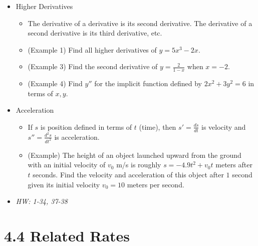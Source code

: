 \documentclass[11pt]{article}
\begin{document}
\begin{itemize}
\item Higher Derivatives
  \begin{itemize}
    \item The derivative of a derivative is its second derivative. The
          derivative of a second derivative is its third derivative, etc.
    \item (Example 1) Find all higher derivatives of \(y=5x^3-2x\).
    \item (Example 3) Find the second derivative of \(y=\frac{2}{1-x}\) when
          \(x=-2\).
    \item (Example 4) Find \(y''\) for the implicit function defined by
          \(2x^2+3y^2=6\) in terms of \(x,y\).
  \end{itemize}
\item Acceleration
  \begin{itemize}
    \item If \(s\) is position defined in terms of \(t\) (time), then
          \(s'=\frac{ds}{dt}\) is velocity and \(s''=\frac{d^2s}{dt^2}\)
          is acceleration.
    \item (Example) The height of an object launched upward from the ground
          with an initial velocity of \(v_0\) m/s is roughly
          \(s=-4.9t^2+v_0t\) meters after \(t\) seconds.
          Find the velocity and acceleration of this object after \(1\) second
          given its initial velocity \(v_0=10\) meters per second.
  \end{itemize}
\item\textit{
  HW: 1-34, 37-38
}
\end{itemize}

\section*{4.4 Related Rates}
\end{document}
